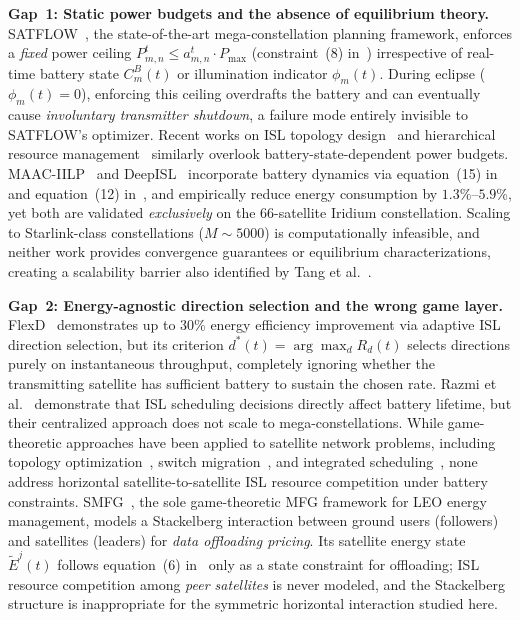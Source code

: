 \documentclass[journal]{IEEEtran}
\newcommand{\CB}{C^{B}}
\begin{document}
\textbf{Gap~1: Static power budgets and the absence
of equilibrium theory.} SATFLOW~\cite{cen2024satflow}, the state-of-the-art mega-constellation planning framework, enforces a
\emph{fixed} power ceiling
$P_{m,n}^t \le a_{m,n}^t \cdot P_{\max}$ (constraint~(8) in~\cite{cen2024satflow}) irrespective of real-time battery state $\CB_m(t)$ or illumination indicator $\phi_m(t)$. During eclipse ($\phi_m(t)=0$), enforcing this ceiling overdrafts the battery and can eventually cause
\emph{involuntary transmitter shutdown}, a failure
mode entirely invisible to SATFLOW's optimizer. Recent works on ISL topology design~\cite{leyva2021connectivity,di2019ultra} and hierarchical resource management~\cite{deng2020ultra} similarly overlook battery-state-dependent power budgets. MAAC-IILP~\cite{li2023energy} and DeepISL~\cite{li2023deepisl} incorporate battery dynamics via equation~(15) in~\cite{li2023energy} and equation~(12) in~\cite{li2023deepisl}, and empirically reduce energy consumption by $1.3\%$--$5.9\%$, yet both are validated
\emph{exclusively} on the 66-satellite Iridium
constellation. Scaling to Starlink-class constellations ($M\!\sim\!5000$) is computationally infeasible, and neither work provides convergence guarantees or equilibrium characterizations, creating a scalability barrier also identified by Tang et al.~\cite{tang2019multipath}.

\textbf{Gap~2: Energy-agnostic direction selection
and the wrong game layer.} FlexD~\cite{lokugama2026flexd} demonstrates up to 30\% energy efficiency improvement via adaptive ISL direction selection, but its criterion $d^*(t)=\arg\max_d R_d(t)$ selects directions purely on instantaneous throughput, completely ignoring whether the transmitting satellite has sufficient battery to sustain the chosen rate. Razmi et al.~\cite{razmi2026battery} demonstrate that ISL scheduling decisions directly affect battery lifetime, but their centralized approach does not scale to mega-constellations. While game-theoretic approaches have been applied to satellite network problems, including topology optimization~\cite{han2024topology}, switch migration~\cite{yan2024switchmigration}, and integrated scheduling~\cite{xing2026matching}, none address horizontal satellite-to-satellite ISL resource competition under battery constraints. SMFG~\cite{wang2023smfg}, the sole game-theoretic MFG framework for LEO energy management, models a Stackelberg interaction between ground users (followers) and satellites (leaders) for
\emph{data offloading pricing}.
Its satellite energy state $\tilde{E}^j(t)$ follows equation~(6) in~\cite{wang2023smfg} only as a state constraint for offloading; ISL resource competition among \emph{peer satellites} is never modeled, and the Stackelberg structure is inappropriate for the symmetric horizontal interaction studied here.
\end{document}
